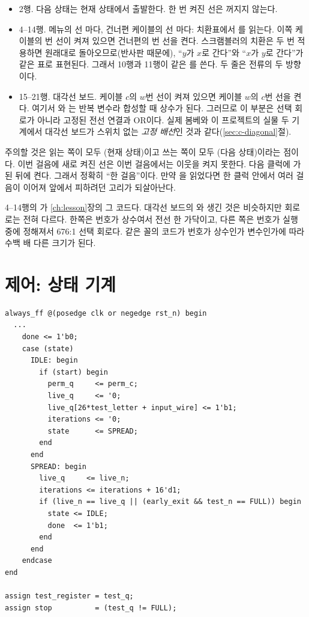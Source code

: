 \begin{itemize}
\item 2행. 다음 상태는 현재 상태에서 출발한다. 한 번 켜진 선은 꺼지지 않는다.
\item 4--14행. 메뉴의 선 마다, 건너편 케이블의 선 마다: 치환표에서 를
읽는다. 이쪽 케이블의 번 선이 켜져 있으면 건너편의 번 선을 켠다. 스크램블러의 치환은 두 번
적용하면 원래대로 돌아오므로(반사판 때문에), ``$y$가 $x$로 간다''와 ``$x$가 $y$로 간다''가 같은 표로 표현된다.
그래서 10행과 11행이 같은 를 쓴다. 두 줄은 전류의 두 방향이다.
\item 15--21행. 대각선 보드. 케이블 $c$의 $w$번 선이 켜져 있으면 케이블 $w$의 $c$번 선을 켠다. 여기서
와 는 반복 변수라 합성할 때 상수가 된다. 그러므로 이 부분은 선택 회로가 아니라 고정된 전선
연결과 OR이다. 실제 봄베와 이 프로젝트의 실물 두 기계에서 대각선 보드가 스위치 없는 \emph{고정 배선}인 것과
같다(\ref{sec:c-diagonal}절).
\end{itemize}

\Why 주의할 것은 읽는 쪽이 모두 (현재 상태)이고 쓰는 쪽이 모두 (다음 상태)이라는
점이다. 이번 걸음에 새로 켜진 선은 이번 걸음에서는 이웃을 켜지 못한다. 다음 클럭에 가 된 뒤에
켠다. 그래서 정확히 ``한 걸음''이다. 만약 을 읽었다면 한 클럭 안에서 여러 걸음이 이어져
앞에서 피하려던 고리가 되살아난다.

4--14행의 가 \ref{ch:lesson}장의 그 코드다. 대각선 보드의
와 생긴 것은 비슷하지만 회로로는 전혀 다르다. 한쪽은 번호가 상수여서 전선 한 가닥이고,
다른 쪽은 번호가 실행 중에 정해져서 676:1 선택 회로다. 같은 꼴의 코드가 번호가 상수인가 변수인가에 따라
수백 배 다른 크기가 된다.

\section{제어: 상태 기계}

\begin{lstlisting}[language=SV,caption={\code{bombe\_core.sv}: 제어(리셋 부분 생략).},label={lst:core-fsm}]
always_ff @(posedge clk or negedge rst_n) begin
  ...
    done <= 1'b0;
    case (state)
      IDLE: begin
        if (start) begin
          perm_q     <= perm_c;
          live_q     <= '0;
          live_q[26*test_letter + input_wire] <= 1'b1;
          iterations <= '0;
          state      <= SPREAD;
        end
      end
      SPREAD: begin
        live_q     <= live_n;
        iterations <= iterations + 16'd1;
        if (live_n == live_q || (early_exit && test_n == FULL)) begin
          state <= IDLE;
          done  <= 1'b1;
        end
      end
    endcase
end

assign test_register = test_q;
assign stop          = (test_q != FULL);
\end{lstlisting}

